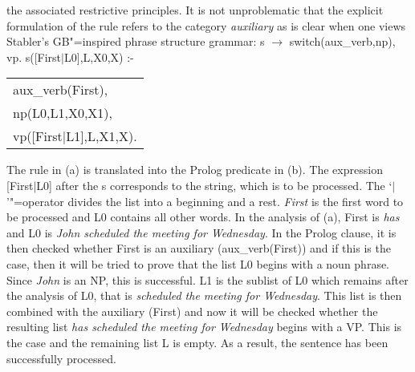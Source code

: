 the associated restrictive principles. It is not unproblematic that the explicit formulation of the rule refers to the category \emph{auxiliary}
as is clear when one views Stabler's GB"=inspired phrase structure grammar: 
\eal
\ex\label{Regel-Aux-inv-Stabler} s $\to$ switch(aux\_verb,np), vp.
\ex s([First$|$L0],L,X0,X) :- \begin{tabular}[t]{@{}l@{}}
                              aux\_verb(First),\\
                              np(L0,L1,X0,X1),\\
                              vp([First$|$L1],L,X1,X).\\
                              \end{tabular}
\zl
%
The rule in (a) is translated into the Prolog predicate in (b). The expression [First$|$L0] after the s corresponds to the string, which
is to be processed. The `$|$'"=operator divides the list into a beginning and a rest. \emph{First} is the first word to be processed
and L0 contains all other words. In the analysis of (a), First is \emph{has} and L0 is \emph{John scheduled the meeting for Wednesday}.
In the Prolog clause, it is then checked whether First is an auxiliary (aux\_verb(First)) and if
this is the case, then it will be tried to prove that the list L0 begins with a noun phrase. Since \emph{John} is an NP, this is successful. L1 is the sublist of L0 which remains after the analysis of L0, that is
\emph{scheduled the meeting for Wednesday}. This list is then combined with the auxiliary (First) and now it will be checked whether the resulting
list \emph{has scheduled the meeting for Wednesday} begins with a VP. This is the case and the remaining list L is empty. As a result, the
sentence has been successfully processed.

